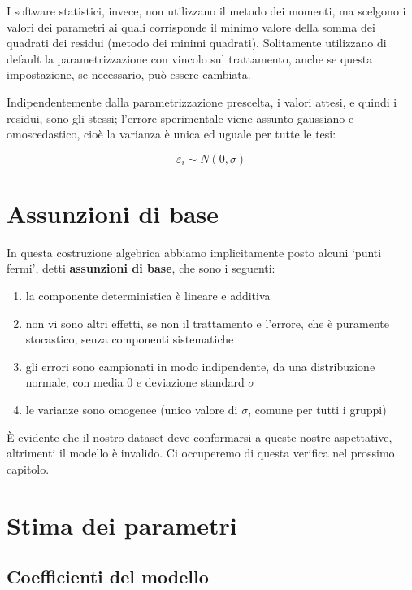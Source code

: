\documentclass[a4paper,12pt,oneside]{book}
\providecommand{\tightlist}{%
  \setlength{\itemsep}{0pt}\setlength{\parskip}{0pt}}
\begin{document}
I software statistici, invece, non utilizzano il metodo dei momenti, ma scelgono i valori dei parametri ai quali corrisponde il minimo valore della somma dei quadrati dei residui (metodo dei minimi quadrati). Solitamente utilizzano di default la parametrizzazione con vincolo sul trattamento, anche se questa impostazione, se necessario, può essere cambiata.

Indipendentemente dalla parametrizzazione prescelta, i valori attesi, e quindi i residui, sono gli stessi; l'errore sperimentale viene assunto gaussiano e omoscedastico, cioè la varianza è unica ed uguale per tutte le tesi:

\[\varepsilon_i \sim N(0, \sigma)\]

\hypertarget{assunzioni-di-base}{%
\section{Assunzioni di base}\label{assunzioni-di-base}}

In questa costruzione algebrica abbiamo implicitamente posto alcuni `punti fermi', detti \textbf{assunzioni di base}, che sono i seguenti:

\begin{enumerate}
\def\labelenumi{\arabic{enumi}.}
\tightlist
\item
  la componente deterministica è lineare e additiva
\item
  non vi sono altri effetti, se non il trattamento e l'errore, che è puramente stocastico, senza componenti sistematiche
\item
  gli errori sono campionati in modo indipendente, da una distribuzione normale, con media 0 e deviazione standard \(\sigma\)
\item
  le varianze sono omogenee (unico valore di \(\sigma\), comune per tutti i gruppi)
\end{enumerate}

È evidente che il nostro dataset deve conformarsi a queste nostre aspettative, altrimenti il modello è invalido. Ci occuperemo di questa verifica nel prossimo capitolo.

\hypertarget{stima-dei-parametri}{%
\section{Stima dei parametri}\label{stima-dei-parametri}}

\hypertarget{coefficienti-del-modello}{%
\subsection{Coefficienti del modello}\label{coefficienti-del-modello}}
\end{document}
